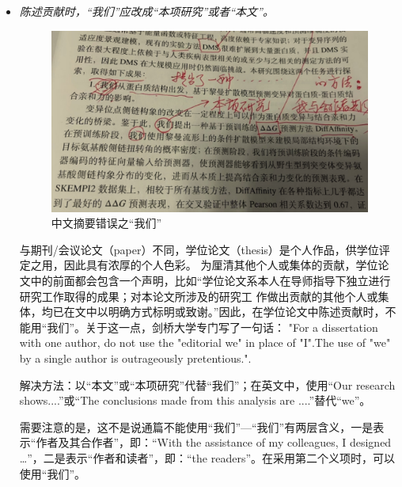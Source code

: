 \begin{itemize}
\item \emph{陈述贡献时，“我们”应改成“本项研究”或者“本文”。}
\begin{figure}[!htpb]
\centering
\includegraphics[scale=0.3]{doc/figures/chk01.jpg}
\caption{中文摘要错误之“我们”}
\label{fig:abstract-error-we}
\end{figure}

与期刊/会议论文（paper）不同，学位论文（thesis）是个人作品，供学位评定之用，因此具有浓厚的个人色彩。
为厘清其他个人或集体的贡献，学位论文中的前面都会包含一个声明，比如“学位论文系本人在导师指导下独立进行研究工作取得的成果；对本论文所涉及的研究工
作做出贡献的其他个人或集体，均已在文中以明确方式标明或致谢。”因此，在学位论文中陈述贡献时，不能用“我们”。关于这一点，剑桥大学专门写了一句话：
"For a dissertation with one author, do not use the "editorial we" in place of "I".The use of "we" by a single author is outrageously pretentious.".

解决方法：以“本文”或“本项研究”代替“我们”；在英文中，使用“Our research shows....”或“The conclusions made from this analysis are ....”替代“we”。

需要注意的是，这不是说通篇不能使用“我们”---“我们”有两层含义，一是表示“作者及其合作者”，即：“With the assistance of my colleagues, I designed …”，二是表示“作者和读者”，即：“the readers”。在采用第二个义项时，可以使用“我们”。



\end{itemize}
